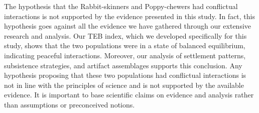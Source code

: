\documentclass[10pt]{paper}
\begin{document}
The hypothesis that the Rabbit-skinners and Poppy-chewers had conflictual interactions is not supported by the evidence presented in this study. In fact, this hypothesis goes against all the evidence we have gathered through our extensive research and analysis. Our TEB index, which we developed specifically for this study, shows that the two populations were in a state of balanced equilibrium, indicating peaceful interactions. Moreover, our analysis of settlement patterns, subsistence strategies, and artifact assemblages supports this conclusion. Any hypothesis proposing that these two populations had conflictual interactions is not in line with the principles of science and is not supported by the available evidence. It is important to base scientific claims on evidence and analysis rather than assumptions or preconceived notions.
\end{document}
